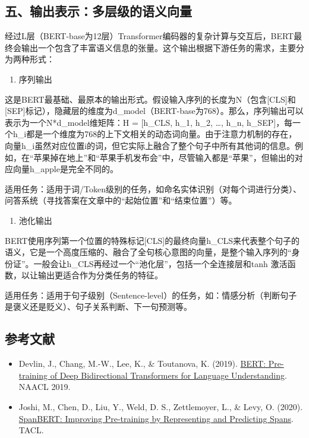 \hypertarget{ux4e94ux8f93ux51faux8868ux793aux591aux5c42ux7ea7ux7684ux8bedux4e49ux5411ux91cf}{%
\subsection{五、输出表示：多层级的语义向量}\label{ux4e94ux8f93ux51faux8868ux793aux591aux5c42ux7ea7ux7684ux8bedux4e49ux5411ux91cf}}

经过L层（BERT-base为12层）Transformer编码器的复杂计算与交互后，BERT最终会输出一个包含了丰富语义信息的张量。这个输出根据下游任务的需求，主要分为两种形式：

\begin{enumerate}
\def\labelenumi{\arabic{enumi}.}
\tightlist
\item
  序列输出
\end{enumerate}

这是BERT最基础、最原本的输出形式。假设输入序列的长度为N（包含{[}CLS{]}和{[}SEP{]}标记），隐藏层的维度为d\_model（BERT-base为768）。那么，序列输出可以表示为一个N*d\_model维矩阵：H = {[}h\_CLS, h\_1, h\_2, \ldots, h\_n, h\_SEP{]}，每一个h\_i都是一个维度为768的上下文相关的动态词向量。由于注意力机制的存在，向量h\_i虽然对应位置i的词，但它实际上融合了整个句子中所有其他词的信息。例如，在``苹果掉在地上''和``苹果手机发布会''中，尽管输入都是``苹果''，但输出的对应向量h\_apple是完全不同的。

适用任务：适用于词/Token级别的任务，如命名实体识别（对每个词进行分类）、问答系统（寻找答案在文章中的``起始位置''和``结束位置''）等。

\begin{enumerate}
\def\labelenumi{\arabic{enumi}.}
\setcounter{enumi}{1}
\tightlist
\item
  池化输出
\end{enumerate}

BERT使用序列第一个位置的特殊标记{[}CLS{]}的最终向量h\_CLS来代表整个句子的语义，它是一个高度压缩的、融合了全句核心意图的向量，是整个输入序列的``身份证''。一般会让h\_CLS再经过一个``池化层''，包括一个全连接层和tanh 激活函数，以让输出更适合作为分类任务的特征。

适用任务：适用于句子级别（Sentence-level）的任务，如：情感分析（判断句子是褒义还是贬义）、句子关系判断、下一句预测等。

\hypertarget{ux53c2ux8003ux6587ux732e-70}{%
\subsection{参考文献}\label{ux53c2ux8003ux6587ux732e-70}}

\begin{itemize}
\tightlist
\item
  Devlin, J., Chang, M.-W., Lee, K., \& Toutanova, K. (2019). \href{https://arxiv.org/abs/1810.04805}{BERT: Pre-training of Deep Bidirectional Transformers for Language Understanding}. NAACL 2019.
\item
  Joshi, M., Chen, D., Liu, Y., Weld, D. S., Zettlemoyer, L., \& Levy, O. (2020). \href{https://arxiv.org/abs/1907.10529}{SpanBERT: Improving Pre-training by Representing and Predicting Spans}. TACL.
\end{itemize}

\clearpage
